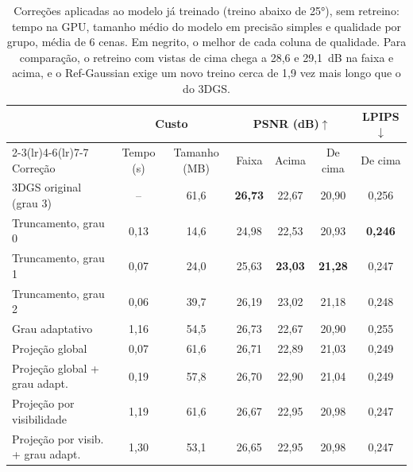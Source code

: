 \begin{table}[t]
\centering
\caption{Correções aplicadas ao modelo já treinado (treino abaixo de 25°), sem retreino: tempo na GPU, tamanho médio do modelo em precisão simples e qualidade por grupo, média de 6 cenas. Em negrito, o melhor de cada coluna de qualidade. Para comparação, o retreino com vistas de cima chega a 28,6 e 29,1~dB na faixa e acima, e o Ref-Gaussian exige um novo treino cerca de 1,9 vez mais longo que o do 3DGS.}
\label{tab:custo25}
\setlength{\tabcolsep}{4pt}
\begin{tabular}{l cc ccc c}
\toprule
 & \multicolumn{2}{c}{Custo} & \multicolumn{3}{c}{PSNR (dB)$\uparrow$} & LPIPS$\downarrow$ \\
\cmidrule(lr){2-3}\cmidrule(lr){4-6}\cmidrule(lr){7-7}
Correção & Tempo (s) & Tamanho (MB) & Faixa & Acima & De cima & De cima \\
\midrule
3DGS original (grau 3) & -- & 61{,}6 & \textbf{26{,}73} & 22{,}67 & 20{,}90 & 0{,}256 \\
\midrule
Truncamento, grau 0 & 0{,}13 & 14{,}6 & 24{,}98 & 22{,}53 & 20{,}93 & \textbf{0{,}246} \\
Truncamento, grau 1 & 0{,}07 & 24{,}0 & 25{,}63 & \textbf{23{,}03} & \textbf{21{,}28} & 0{,}247 \\
Truncamento, grau 2 & 0{,}06 & 39{,}7 & 26{,}19 & 23{,}02 & 21{,}18 & 0{,}248 \\
Grau adaptativo~\cite{papantonakis2024reducing} & 1{,}16 & 54{,}5 & 26{,}73 & 22{,}67 & 20{,}90 & 0{,}255 \\
Projeção global & 0{,}07 & 61{,}6 & 26{,}71 & 22{,}89 & 21{,}03 & 0{,}249 \\
Projeção global + grau adapt. & 0{,}19 & 57{,}8 & 26{,}70 & 22{,}90 & 21{,}04 & 0{,}249 \\
Projeção por visibilidade & 1{,}19 & 61{,}6 & 26{,}67 & 22{,}95 & 20{,}98 & 0{,}247 \\
Projeção por visib. + grau adapt. & 1{,}30 & 53{,}1 & 26{,}65 & 22{,}95 & 20{,}98 & 0{,}247 \\
\bottomrule
\end{tabular}
\end{table}
